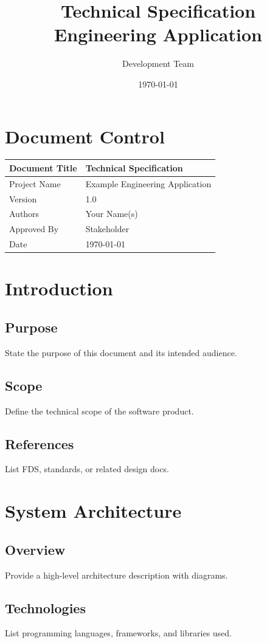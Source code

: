\documentclass[12pt,a4paper]{article}
\title{Technical Specification \\ Engineering Application}
\author{Development Team}
\date{\today}
\begin{document}
	\maketitle
	\tableofcontents
	\newpage
	
	\section{Document Control}
	\begin{tabular}{|l|l|}
		\hline
		Document Title & Technical Specification \\
		\hline
		Project Name & Example Engineering Application \\
		\hline
		Version & 1.0 \\
		\hline
		Authors & Your Name(s) \\
		\hline
		Approved By & Stakeholder \\
		\hline
		Date & \today \\
		\hline
	\end{tabular}
	
	\section{Introduction}
	\subsection{Purpose}
	State the purpose of this document and its intended audience.
	
	\subsection{Scope}
	Define the technical scope of the software product.
	
	\subsection{References}
	List FDS, standards, or related design docs.
	
	\section{System Architecture}
	\subsection{Overview}
	Provide a high-level architecture description with diagrams.
	
	\subsection{Technologies}
	List programming languages, frameworks, and libraries used.
	
\end{document}
